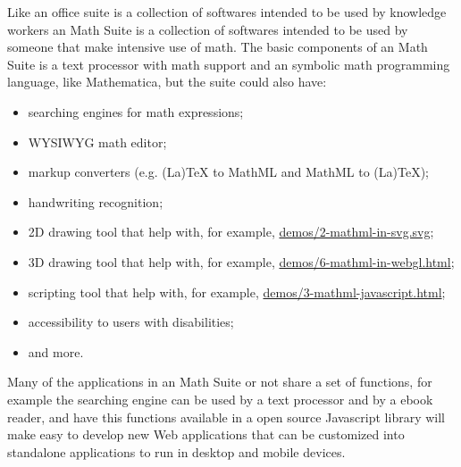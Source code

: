 Like an office suite is a collection of softwares intended to be used by
knowledge workers an Math Suite is a collection of softwares intended to be used
by someone that make intensive use of math. The basic components of an Math
Suite is a text processor with math support and an symbolic math programming
language, like Mathematica, but the suite could also have:
\begin{itemize}
  \item searching engines for math expressions;
  \item WYSIWYG math editor;
  \item markup converters (e.g. (La)TeX to MathML and MathML to (La)TeX);
  \item handwriting recognition;
  \item 2D drawing tool that help with, for example,
    \href{http://fred-wang.github.io/MathUI2014/demos/2-mathml-in-svg.svg}{demos/2-mathml-in-svg.svg};
  \item 3D drawing tool that help with, for example,
    \href{http://fred-wang.github.io/MathUI2014/demos/6-mathml-in-webgl.html}{demos/6-mathml-in-webgl.html};
  \item scripting tool that help with, for example,
    \href{http://fred-wang.github.io/MathUI2014/demos/3-mathml-javascript.html}{demos/3-mathml-javascript.html};
  \item accessibility to users with disabilities;
  \item and more.
\end{itemize}

Many of the applications in an Math Suite or not share a set of functions, for
example the searching engine can be used by a text processor and by a ebook
reader, and have
this functions available in a open source Javascript library will make easy to
develop new Web applications that can be customized into standalone applications
to run in desktop and mobile devices.

